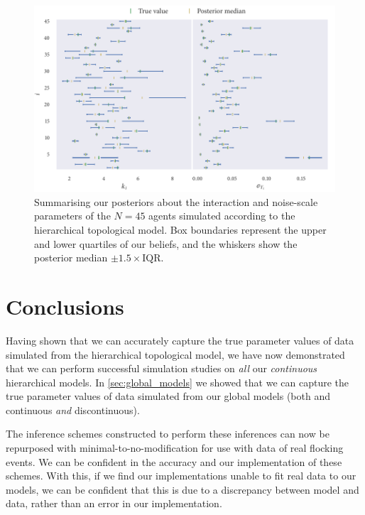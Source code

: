 \begin{figure}[tbp]
  \includegraphics{top/top_hier_summary.pdf}
  \caption{Summarising our posteriors about the interaction and
    noise-scale parameters of the $N=45$ agents simulated according to the
    hierarchical topological model. Box boundaries represent the upper and
    lower quartiles of our beliefs, and the whiskers show the posterior
    median $\pm1.5\times\text{IQR}$.}
  \label{fig:top_hier_summary}
\end{figure}

\section*{Conclusions}

Having shown that we can accurately capture the true parameter values of data
simulated from the hierarchical topological model, we have now demonstrated
that we can perform successful simulation studies on \emph{all} our
\emph{continuous} hierarchical models. In \cref{sec:global_models} we showed
that we can capture the true parameter values of data simulated from our global
models (both and continuous \emph{and} discontinuous).

The inference schemes constructed to perform these inferences can now be
repurposed with minimal-to-no-modification for use with data of real flocking
events. We can be confident in the accuracy and our implementation of these
schemes. With this, if we find our implementations unable to fit real data to
our models, we can be confident that this is due to a discrepancy between model
and data, rather than an error in our implementation.
